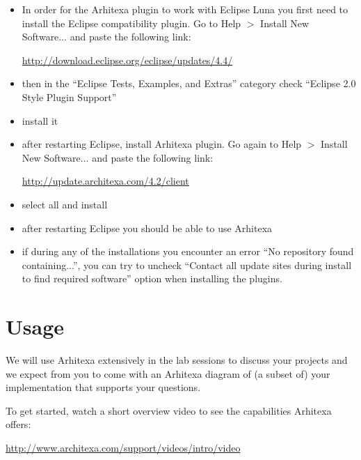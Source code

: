 \documentclass{article}
\begin{document}
\begin{itemize}

\item In order for the Arhitexa plugin to work with Eclipse Luna you
  first need to install the Eclipse compatibility plugin. Go to Help
  $>$ Install New Software... and paste the following link:

\url{http://download.eclipse.org/eclipse/updates/4.4/}

\item then in the ``Eclipse Tests, Examples, and Extras'' category check ``Eclipse 2.0 Style Plugin Support''
\item install it
\item after restarting Eclipse, install Arhitexa plugin. Go again to Help
  $>$ Install New Software... and paste the following link:

\url{http://update.architexa.com/4.2/client}

\item select all and install
\item after restarting Eclipse you should be able to use Arhitexa
\item if during any of the installations you encounter an error ``No
  repository found containing...'', you can try to uncheck ``Contact
  all update sites during install to find required software'' option
  when installing the plugins.

\end{itemize}

\section{Usage}
We will use Arhitexa extensively in the lab sessions to discuss your
projects and we expect from you to come with an Arhitexa diagram of
(a subset of) your implementation that supports your questions.

To get started, watch a short overview video to see the
capabilities Arhitexa offers:


\url{http://www.architexa.com/support/videos/intro/video}
\end{document}
